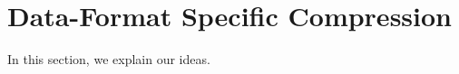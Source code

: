 \section{Data-Format Specific Compression}
\label{sec:generated-compression}

In this section, we explain our ideas.